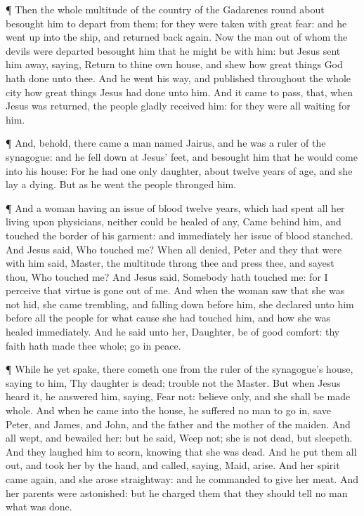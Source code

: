  ¶ Then the whole multitude of the country of the Gadarenes
round about besought him to depart from them; for they were taken with
great fear: and he went up into the ship, and returned back again.
 Now the man out of whom the devils were departed besought
him that he might be with him: but Jesus sent him away, saying,
 Return to thine own house, and shew how great things God
hath done unto thee. And he went his way, and published throughout the
whole city how great things Jesus had done unto him.  And
it came to pass, that, when Jesus was returned, the people gladly
received him: for they were all waiting for him.

 ¶ And, behold, there came a man named Jairus, and he was a
ruler of the synagogue: and he fell down at Jesus' feet, and besought
him that he would come into his house:  For he had one only
daughter, about twelve years of age, and she lay a dying. But as he went
the people thronged him.

 ¶ And a woman having an issue of blood twelve years, which
had spent all her living upon physicians, neither could be healed of
any,  Came behind him, and touched the border of his
garment: and immediately her issue of blood stanched.  And
Jesus said, Who touched me? When all denied, Peter and they that were
with him said, Master, the multitude throng thee and press thee, and
sayest thou, Who touched me?  And Jesus said, Somebody hath
touched me: for I perceive that virtue is gone out of me. 
And when the woman saw that she was not hid, she came trembling, and
falling down before him, she declared unto him before all the people for
what cause she had touched him, and how she was healed immediately.
 And he said unto her, Daughter, be of good comfort: thy
faith hath made thee whole; go in peace.

 ¶ While he yet spake, there cometh one from the ruler of
the synagogue's house, saying to him, Thy daughter is dead; trouble not
the Master.  But when Jesus heard it, he answered him,
saying, Fear not: believe only, and she shall be made whole.
 And when he came into the house, he suffered no man to go
in, save Peter, and James, and John, and the father and the mother of
the maiden.  And all wept, and bewailed her: but he said,
Weep not; she is not dead, but sleepeth.  And they laughed
him to scorn, knowing that she was dead.  And he put them
all out, and took her by the hand, and called, saying, Maid, arise.
 And her spirit came again, and she arose straightway: and
he commanded to give her meat.  And her parents were
astonished: but he charged them that they should tell no man what was
done.

